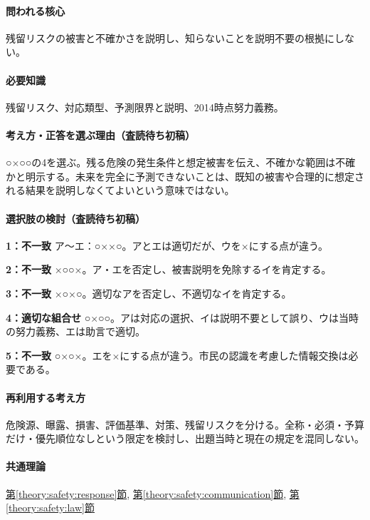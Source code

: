 \paragraph{問われる核心} 残留リスクの被害と不確かさを説明し、知らないことを説明不要の根拠にしない。

\paragraph{必要知識} 残留リスク、対応類型、予測限界と説明、2014時点努力義務。

\paragraph{考え方・正答を選ぶ理由（査読待ち初稿）} ○×○○の4を選ぶ。残る危険の発生条件と想定被害を伝え、不確かな範囲は不確かと明示する。未来を完全に予測できないことは、既知の被害や合理的に想定される結果を説明しなくてよいという意味ではない。

\paragraph{選択肢の検討（査読待ち初稿）}\mbox{}\par

\noindent\textbf{1：不一致} ア〜エ：○××○。アとエは適切だが、ウを×にする点が違う。\par

\noindent\textbf{2：不一致} ×○○×。ア・エを否定し、被害説明を免除するイを肯定する。\par

\noindent\textbf{3：不一致} ×○×○。適切なアを否定し、不適切なイを肯定する。\par

\noindent\textbf{4：適切な組合せ} ○×○○。アは対応の選択、イは説明不要として誤り、ウは当時の努力義務、エは助言で適切。\par

\noindent\textbf{5：不一致} ○×○×。エを×にする点が違う。市民の認識を考慮した情報交換は必要である。\par

\paragraph{再利用する考え方} 危険源、曝露、損害、評価基準、対策、残留リスクを分ける。全称・必須・予算だけ・優先順位なしという限定を検討し、出題当時と現在の規定を混同しない。

\paragraph{共通理論} \hyperref[theory:safety:response]{第\ref*{theory:safety:response}節}, \hyperref[theory:safety:communication]{第\ref*{theory:safety:communication}節}, \hyperref[theory:safety:law]{第\ref*{theory:safety:law}節}

